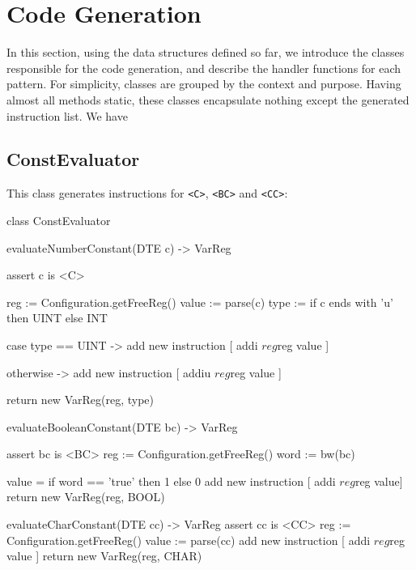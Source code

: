 \section{Code Generation}\label{sec:code_gen}
In this section, using the data structures defined so far, we introduce the classes responsible for the code generation, and describe the handler
functions for each pattern. For simplicity, classes are grouped by the context and purpose. Having almost all
methods static, these classes encapsulate nothing except the generated instruction list. We have
\subsection{ConstEvaluator}
This class generates instructions for \verb+<C>+, \verb+<BC>+ and \verb+<CC>+:
\begin{codeblock}
class ConstEvaluator {
    evaluateNumberConstant(DTE c) -> VarReg {
        assert c is <C>

        reg := Configuration.getFreeReg()
        value := parse(c)
        type := if c ends with 'u' then UINT else INT

        case type == UINT -> {
            add new instruction [ addi $reg $reg value ]
        }

        otherwise -> {
            add new instruction [ addiu $reg $reg value ]
        }

        return new VarReg(reg, type)
    }

    evaluateBooleanConstant(DTE bc) -> VarReg {
        assert bc is <BC>
        reg := Configuration.getFreeReg()
        word := bw(bc)

        value = if word == 'true' then 1 else 0
        add new instruction [ addi $reg $reg value]
        return new VarReg(reg, BOOL)
    }

    evaluateCharConstant(DTE cc) -> VarReg {
        assert cc is <CC>
        reg := Configuration.getFreeReg()
        value := parse(cc)
        add new instruction [ addi $reg $reg value ]
        return new VarReg(reg, CHAR)
    }
}
\end{codeblock}
